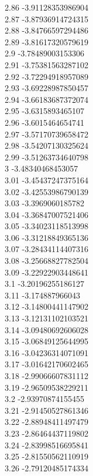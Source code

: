 {2.86	-3.91128353986904\\
2.87	-3.87936914724315\\
2.88	-3.84766597294486\\
2.89	-3.81617320579619\\
2.9	-3.78489003153306\\
2.91	-3.75381563287102\\
2.92	-3.72294918957089\\
2.93	-3.69228987850457\\
2.94	-3.66183687372074\\
2.95	-3.6315893465107\\
2.96	-3.6015464654741\\
2.97	-3.57170739658472\\
2.98	-3.54207130325624\\
2.99	-3.51263734640798\\
3	-3.48340468453057\\
3.01	-3.45437247375164\\
3.02	-3.42553986790139\\
3.03	-3.3969060185782\\
3.04	-3.36847007521406\\
3.05	-3.34023118513998\\
3.06	-3.31218849365136\\
3.07	-3.28434114407316\\
3.08	-3.25668827782504\\
3.09	-3.22922903448641\\
3.1	-3.20196255186127\\
3.11	-3.174887966043\\
3.12	-3.14800441147902\\
3.13	-3.12131102103521\\
3.14	-3.09480692606028\\
3.15	-3.06849125644995\\
3.16	-3.04236314071091\\
3.17	-3.01642170602465\\
3.18	-2.99066607831112\\
3.19	-2.96509538229211\\
3.2	-2.93970874155455\\
3.21	-2.91450527861346\\
3.22	-2.88948411497479\\
3.23	-2.86464437119802\\
3.24	-2.83998516695841\\
3.25	-2.81550562110919\\
3.26	-2.79120485174334\\
}
